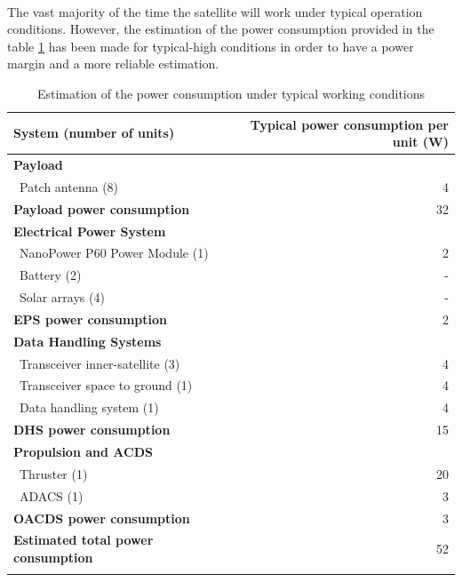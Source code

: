 \paragraph{}The vast majority of the time the satellite will work under typical operation conditions. However, the estimation of the power consumption provided in the table \ref{powerestimation} has been made for typical-high conditions in order to have a power margin and a more reliable estimation.


\begin{longtable}{| l | r | }
\hline
\rowcolor[gray]{0.80}	\textbf{System (number of units)} &  \textbf{Typical power consumption per unit (W)} \\
\hline
\endfirsthead

\rowcolor[gray]{0.85} \textbf{Payload} &  \\
	   ~Patch antenna (8) & 4 \\
	   \rowcolor[gray]{0.95} \textbf{Payload power consumption} & 32 \\
	   \hline
	\hline

\rowcolor[gray]{0.85} \textbf{Electrical Power System} &  \\
	   ~NanoPower P60 Power Module (1) & 2 \\
	   ~Battery (2) & - \\
	   ~Solar arrays (4) & -\\
	   \rowcolor[gray]{0.95} \textbf{EPS power consumption} & 2 \\
	   \hline
	\hline
	
\rowcolor[gray]{0.85} \textbf{Data Handling Systems} &  \\
	   ~Transceiver inner-satellite (3) & 4 \\
	   ~Transceiver space to ground (1) & 4 \\
	   ~Data handling system (1) & 4 \\
	   \rowcolor[gray]{0.95} \textbf{DHS power consumption} & 15 \\
	   \hline
	\hline
	
\rowcolor[gray]{0.85} \textbf{Propulsion and ACDS} &  \\
	   ~Thruster (1) & 20 \\
	   ~ADACS (1) & 3 \\
	   \rowcolor[gray]{0.95} \textbf{OACDS power consumption} & 3 \\
	   \hline
	\hline

\rowcolor[gray]{0.65} \textbf{Estimated total power consumption} & 52 \\

\caption{Estimation of the power consumption under typical working conditions}
\label{powerestimation}
\end{longtable}


